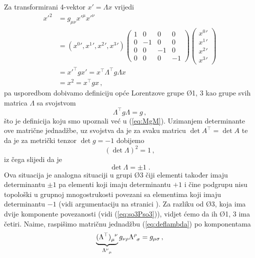 Za transformirani 4-vektor $x' = \Lambda x$ vrijedi
\begin{align}
 {x'}^2 &= g_{\mu\nu} {x'}^\mu {x'}^\nu \\
        &= ({x^0}', {x^1}', {x^2}', {x^3}')
\begin{pmatrix}
1 & 0 & 0 & 0 \\
0 &-1 & 0 & 0 \\
0 & 0 &-1 & 0 \\
0 & 0 & 0 &-1
\end{pmatrix}
\begin{pmatrix}
{x^0}' \\ {x^1}' \\ {x^2}' \\ {x^3}'
\end{pmatrix} \\
  &= {x'}^{\top} g x' = x^\top \Lambda^\top g \Lambda x \\
  &= x^2 = x^\top g x \,,
\end{align}
pa usporedbom dobivamo definiciju opće Lorentzove grupe
\O{1, 3}
kao grupe svih matrica $\Lambda$ sa svojstvom
\begin{equation}
   \Lambda^\top g \Lambda = g \,,
\label{deflambda}
\end{equation}
što je definicija koju smo upoznali već u (\ref{eq:MgM}).
Uzimanjem determinante ove matrične jednadžbe, uz svojstva
da je za svaku matricu $\det A^\top = \det A$ te da je za
metrički tenzor $\det g = -1$ dobijemo 
\begin{equation}
   (\det \Lambda)^2 = 1 \,,
\end{equation}
iz čega slijedi da je
\begin{equation}
   \det\Lambda = \pm 1 \;.
\label{detL}
\end{equation}
Ova situacija je analogna situaciji u grupi \O{3} čiji elementi
također imaju determinantu $\pm 1$ pa  elementi koji imaju
determinantu $+1$ i čine podgrupu  nisu topološki
u grupnoj mnogostrukosti povezani sa elementima koji imaju
determinantu $-1$ (vidi argumentaciju na
stranici \pageref{pag:povezanostO3}). Za razliku od \O{3}, koja ima
dvije komponente povezanosti (vidi (\ref{eq:so3Pso3})), 
vidjet ćemo da ih \O{1, 3} ima četiri.
Naime, raspišimo matričnu jednadžbu (\ref{eq:deflambda})  po komponentama
\begin{equation}
    \underbrace{\tensor{(\Lambda^\top)}{_{\mu}^{\nu}}}_{\tensor{\Lambda}{^{\nu}_{\mu}}}
    g_{\nu\rho}\tensor{\Lambda}{^{\rho}_{\sigma}} = g_{\mu\sigma} \,,
\end{equation}
